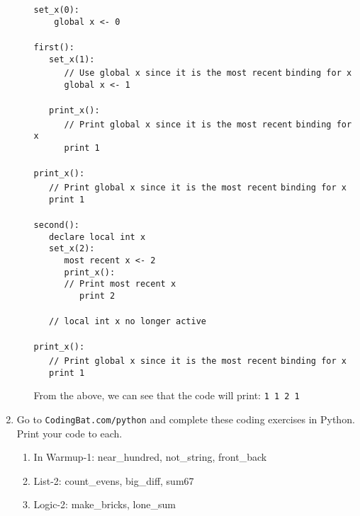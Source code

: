 \documentclass[9pt]{article}
\begin{document}
\begin{enumerate}
\begin{enumerate}
               \verb|set_x(0):| \\
               \verb|    global x <- 0| \\ \\
               \verb|first():| \\
               \verb|   set_x(1):| \\
               \verb|      // Use global x since it is the most recent|
               \verb|binding for x| \\
               \verb|      global x <- 1| \\ \\
               \verb|   print_x():| \\
               \verb|      // Print global x since it is the most recent|
               \verb|binding for x| \\
               \verb|      print 1| \\ \\
               \verb|print_x():| \\
               \verb|   // Print global x since it is the most recent|
               \verb|binding for x| \\
               \verb|   print 1| \\ \\
               \verb|second():| \\
               \verb|   declare local int x| \\
               \verb|   set_x(2):| \\
               \verb|      most recent x <- 2| \\
               \verb|      print_x():| \\
               \verb|      // Print most recent x| \\
               \verb|         print 2| \\ \\
               \verb|   // local int x no longer active| \\ \\
               \verb|print_x():| \\
               \verb|   // Print global x since it is the most recent|
               \verb|binding for x| \\
               \verb|   print 1|

               From the above, we can see that the code will print:
               \verb|1 1 2 1|
      \end{enumerate}
   \item Go to \verb|CodingBat.com/python| and complete these coding exercises
         in Python. Print your code to each.
         \begin{enumerate}
            \item In Warmup-1: near\_hundred, not\_string, front\_back
            \item List-2: count\_evens, big\_diff, sum67
            \item Logic-2: make\_bricks, lone\_sum
         \end{enumerate}


\end{enumerate}
\end{document}
